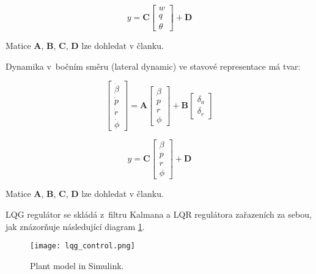 \documentclass[../report.tex]{subfiles}
\begin{document}
\begin{equation}
    y = \textbf{C}
    \begin{bmatrix}
        w \\
        q \\
        \theta 
    \end{bmatrix} + \textbf{D}
\end{equation}

Matice \textbf{A}, \textbf{B}, \textbf{C}, \textbf{D} lze dohledat v članku.


Dynamika v bočním směru (lateral dynamic) ve stavové representace má tvar:


\begin{equation}
    \begin{bmatrix}
        \dot{\beta} \\
        \dot{p} \\
        \dot{r} \\
        \dot{\phi} 
    \end{bmatrix} 
    = \textbf{A}   
    \begin{bmatrix}
        \beta \\
        p \\
        r \\
        \phi 
    \end{bmatrix} 
    + \textbf{B}
    \begin{bmatrix}
        \delta_a \\
        \delta_r
    \end{bmatrix} 
\end{equation}

\begin{equation}
    y = \textbf{C} 
    \begin{bmatrix}
        \beta \\
        p \\
        r \\
        \phi 
    \end{bmatrix} + \textbf{D}
\end{equation}

Matice \textbf{A}, \textbf{B}, \textbf{C}, \textbf{D} lze dohledat v članku.

LQG regulátor se skládá z filtru Kalmana a LQR regulátora zařazeních za sebou,
jak znázorňuje následující diagram \ref{fig:lqg_control}. 
\begin{figure}[ht]
    \centering
    \texttt{[image: lqg\_control.png]}
    \caption{Plant model in Simulink.}
    \label{fig:lqg_control}
\end{figure} \\
\end{document}
